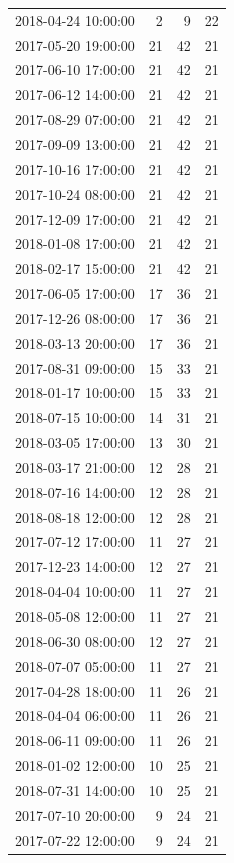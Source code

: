 \begin{tabular}{lrrr}
2018-04-24 10:00:00 & 2 & 9 & 22 \\
2017-05-20 19:00:00 & 21 & 42 & 21 \\
2017-06-10 17:00:00 & 21 & 42 & 21 \\
2017-06-12 14:00:00 & 21 & 42 & 21 \\
2017-08-29 07:00:00 & 21 & 42 & 21 \\
2017-09-09 13:00:00 & 21 & 42 & 21 \\
2017-10-16 17:00:00 & 21 & 42 & 21 \\
2017-10-24 08:00:00 & 21 & 42 & 21 \\
2017-12-09 17:00:00 & 21 & 42 & 21 \\
2018-01-08 17:00:00 & 21 & 42 & 21 \\
2018-02-17 15:00:00 & 21 & 42 & 21 \\
2017-06-05 17:00:00 & 17 & 36 & 21 \\
2017-12-26 08:00:00 & 17 & 36 & 21 \\
2018-03-13 20:00:00 & 17 & 36 & 21 \\
2017-08-31 09:00:00 & 15 & 33 & 21 \\
2018-01-17 10:00:00 & 15 & 33 & 21 \\
2018-07-15 10:00:00 & 14 & 31 & 21 \\
2018-03-05 17:00:00 & 13 & 30 & 21 \\
2018-03-17 21:00:00 & 12 & 28 & 21 \\
2018-07-16 14:00:00 & 12 & 28 & 21 \\
2018-08-18 12:00:00 & 12 & 28 & 21 \\
2017-07-12 17:00:00 & 11 & 27 & 21 \\
2017-12-23 14:00:00 & 12 & 27 & 21 \\
2018-04-04 10:00:00 & 11 & 27 & 21 \\
2018-05-08 12:00:00 & 11 & 27 & 21 \\
2018-06-30 08:00:00 & 12 & 27 & 21 \\
2018-07-07 05:00:00 & 11 & 27 & 21 \\
2017-04-28 18:00:00 & 11 & 26 & 21 \\
2018-04-04 06:00:00 & 11 & 26 & 21 \\
2018-06-11 09:00:00 & 11 & 26 & 21 \\
2018-01-02 12:00:00 & 10 & 25 & 21 \\
2018-07-31 14:00:00 & 10 & 25 & 21 \\
2017-07-10 20:00:00 & 9 & 24 & 21 \\
2017-07-22 12:00:00 & 9 & 24 & 21 \\

\end{tabular}
